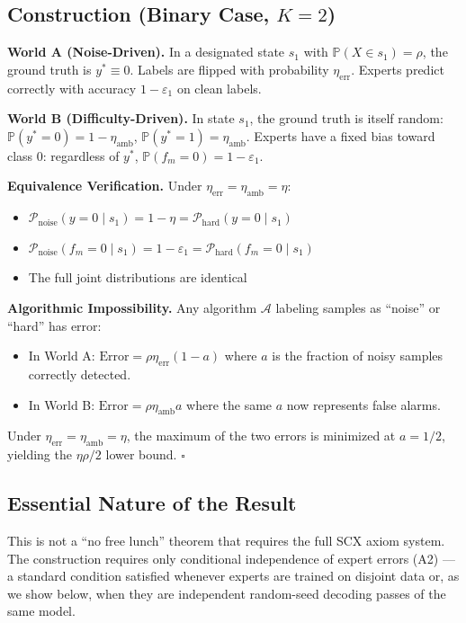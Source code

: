 \documentclass[12pt,a4paper]{article}
\theoremstyle{definition}
\theoremstyle{remark}
\begin{document}
\subsection{Construction (Binary Case, $K=2$)}

\textbf{World A (Noise-Driven).} In a designated state $s_1$ with $\mathbb{P}(X \in s_1) = \rho$, the ground truth is $y^* \equiv 0$. Labels are flipped with probability $\eta_{\text{err}}$. Experts predict correctly with accuracy $1 - \varepsilon_1$ on clean labels.

\textbf{World B (Difficulty-Driven).} In state $s_1$, the ground truth is itself random: $\mathbb{P}(y^*=0) = 1-\eta_{\text{amb}}$, $\mathbb{P}(y^*=1) = \eta_{\text{amb}}$. Experts have a fixed bias toward class 0: regardless of $y^*$, $\mathbb{P}(f_m=0) = 1-\varepsilon_1$.

\textbf{Equivalence Verification.} Under $\eta_{\text{err}} = \eta_{\text{amb}} = \eta$:
\begin{itemize}
\item $\mathcal{P}_{\text{noise}}(y=0 \mid s_1) = 1-\eta = \mathcal{P}_{\text{hard}}(y=0 \mid s_1)$ \checkmark
\item $\mathcal{P}_{\text{noise}}(f_m=0 \mid s_1) = 1-\varepsilon_1 = \mathcal{P}_{\text{hard}}(f_m=0 \mid s_1)$ \checkmark
\item The full joint distributions are identical \checkmark
\end{itemize}

\textbf{Algorithmic Impossibility.} Any algorithm $\mathcal{A}$ labeling samples as ``noise'' or ``hard'' has error:
\begin{itemize}
\item In World A: $\text{Error} = \rho\eta_{\text{err}}(1-a)$ where $a$ is the fraction of noisy samples correctly detected.
\item In World B: $\text{Error} = \rho\eta_{\text{amb}}a$ where the same $a$ now represents false alarms.
\end{itemize}

Under $\eta_{\text{err}} = \eta_{\text{amb}} = \eta$, the maximum of the two errors is minimized at $a = 1/2$, yielding the $\eta\rho/2$ lower bound. \hfill $\square$

\subsection{Essential Nature of the Result}

This is not a ``no free lunch'' theorem that requires the full SCX axiom system. The construction requires only conditional independence of expert errors (A2) — a standard condition satisfied whenever experts are trained on disjoint data or, as we show below, when they are independent random-seed decoding passes of the same model.
\end{document}
